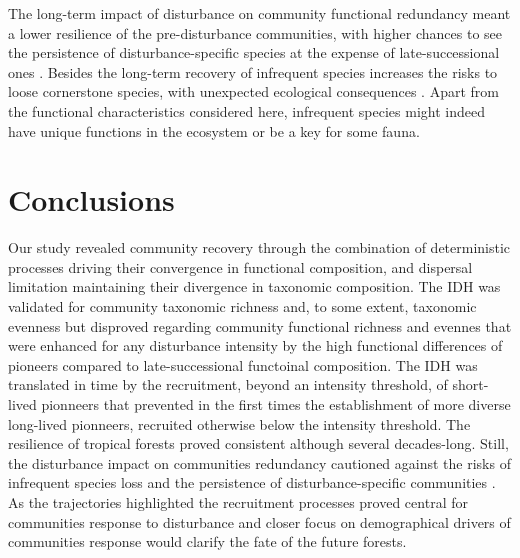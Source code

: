 \documentclass[fleqn,10pt]{ArtEcoFoG} %
\begin{document}
The long-term impact of disturbance on community functional redundancy
meant a lower resilience of the pre-disturbance communities, with higher
chances to see the persistence of disturbance-specific species at the
expense of late-successional ones
\citep{Haddad2008, Burslem2000, Martin2013}. Besides the long-term
recovery of infrequent species increases the risks to loose cornerstone
species, with unexpected ecological consequences
\citep{Jones1994, Chazdon2003a, Diaz2005, Gardner2007}. Apart from the
functional characteristics considered here, infrequent species might
indeed have unique functions in the ecosystem or be a key for some
fauna.

\section{Conclusions}\label{conclusions}

Our study revealed community recovery through the combination of
deterministic processes driving their convergence in functional
composition, and dispersal limitation maintaining their divergence in
taxonomic composition. The IDH was validated for community taxonomic
richness and, to some extent, taxonomic evenness but disproved regarding
community functional richness and evennes that were enhanced for any
disturbance intensity by the high functional differences of pioneers
compared to late-successional functoinal composition. The IDH was
translated in time by the recruitment, beyond an intensity threshold, of
short-lived pionneers that prevented in the first times the
establishment of more diverse long-lived pionneers, recruited otherwise
below the intensity threshold. The resilience of tropical forests proved
consistent although several decades-long. Still, the disturbance impact
on communities redundancy cautioned against the risks of infrequent
species loss and the persistence of disturbance-specific communities
\citep{Gourlet-Fleury2005}. As the trajectories highlighted the
recruitment processes proved central for communities response to
disturbance and closer focus on demographical drivers of communities
response would clarify the fate of the future forests.



\makeatletter

\makeatother


\end{document}
